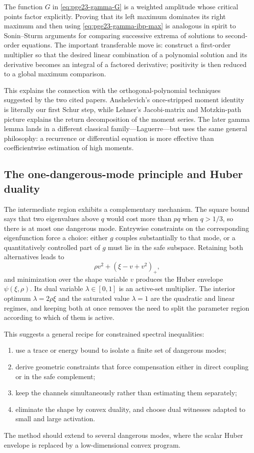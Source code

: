 ﻿\documentclass[11pt]{article}
\numberwithin{equation}{section}
\begin{document}
The function $G$ in \eqref{eq:pge23-gamma-G} is a weighted amplitude whose critical points factor explicitly.
Proving that its left maximum dominates its right maximum and then using \eqref{eq:pge23-gamma-ibp-max} is analogous in spirit to Sonin--Sturm arguments for comparing successive extrema of solutions to second-order equations.
The important transferable move is: construct a first-order multiplier so that the desired linear combination of a polynomial solution and its derivative becomes an integral of a factored derivative; positivity is then reduced to a global maximum comparison.

This explains the connection with the orthogonal-polynomial techniques suggested by the two cited papers.
Anshelevich's once-stripped moment identity is literally our first Schur step, while Lehner's Jacobi-matrix and Motzkin-path picture explains the return decomposition of the moment series.
The later gamma lemma lands in a different classical family---Laguerre---but uses the same general philosophy: a recurrence or differential equation is more effective than coefficientwise estimation of high moments.

\subsection{The one-dangerous-mode principle and Huber duality}

The intermediate region exhibits a complementary mechanism.
The square bound says that two eigenvalues above $q$ would cost more than $pq$ when $q>1/3$, so there is at most one dangerous mode.
Entrywise constraints on the corresponding eigenfunction force a choice: either $g$ couples substantially to that mode, or a quantitatively controlled part of $g$ must lie in the safe subspace.
Retaining both alternatives leads to
\[
  \rho v^2+(\xi-v+v^2)_+,
\]
and minimization over the shape variable $v$ produces the Huber envelope $\psi(\xi,\rho)$.
Its dual variable $\lambda\in[0,1]$ is an active-set multiplier.
The interior optimum $\lambda=2\rho\xi$ and the saturated value $\lambda=1$ are the quadratic and linear regimes, and keeping both at once removes the need to split the parameter region according to which of them is active.

This suggests a general recipe for constrained spectral inequalities:
\begin{enumerate}[leftmargin=2.2em]
  \item use a trace or energy bound to isolate a finite set of dangerous modes;
  \item derive geometric constraints that force compensation either in direct coupling or in the safe complement;
  \item keep the channels simultaneously rather than estimating them separately;
  \item eliminate the shape by convex duality, and choose dual witnesses adapted to small and large activation.
\end{enumerate}
The method should extend to several dangerous modes, where the scalar Huber envelope is replaced by a low-dimensional convex program.
\end{document}
